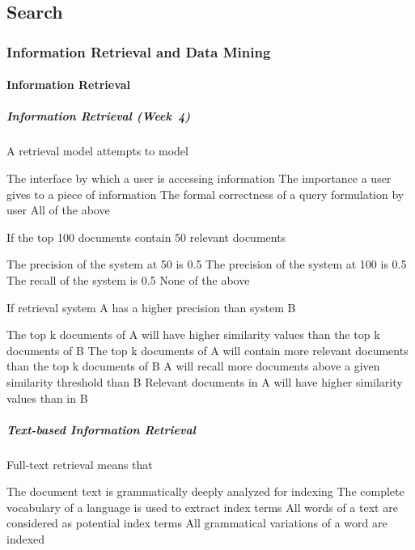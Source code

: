 \documentclass[12pt,a4paper,answers]{exam} %
\begin{document}
\begin{flushleft}
\begin{multicols*}{2}
\begin{questions}
\part{Search}
\section{Information Retrieval and Data Mining}
\subsection{Information Retrieval} %
\subsubsection{Information Retrieval (Week~4)}

\question A retrieval model attempts to model
\begin{checkboxes}
\choice The interface by which a user is accessing information
\CorrectChoice The importance a user gives to a piece of information
\choice The formal correctness of a query formulation by user
\choice All of the above
\end{checkboxes}

\question If the top 100 documents contain 50 relevant documents
\begin{checkboxes}
\choice The precision of the system at 50 is 0.5
\CorrectChoice The precision of the system at 100 is 0.5
\choice The recall of the system is 0.5
\choice None of the above
\end{checkboxes}

\question If retrieval system A has a higher precision than system B
\begin{checkboxes}
\choice The top k documents of A will have higher similarity values than the top k documents of B
\CorrectChoice The top k documents of A will contain more relevant documents than the top k documents of B
\choice A will recall more documents above a given similarity threshold than B
\choice Relevant documents in A will have higher similarity values than in B
\end{checkboxes}


\subsubsection{Text-based Information Retrieval}

\question Full-text retrieval means that
\begin{checkboxes}
\choice The document text is grammatically deeply analyzed for indexing
\choice The complete vocabulary of a language is used to extract index terms
\CorrectChoice All words of a text are considered as potential index terms
\choice All grammatical variations of a word are indexed
\end{checkboxes}


\end{questions}
\end{multicols*}
\end{flushleft}
\end{document}
